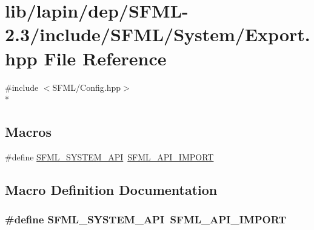 \hypertarget{lapin_2dep_2_s_f_m_l-2_83_2include_2_s_f_m_l_2_system_2_export_8hpp}{\section{lib/lapin/dep/\-S\-F\-M\-L-\/2.3/include/\-S\-F\-M\-L/\-System/\-Export.hpp File Reference}
\label{lapin_2dep_2_s_f_m_l-2_83_2include_2_s_f_m_l_2_system_2_export_8hpp}
}
{\ttfamily \#include $<$S\-F\-M\-L/\-Config.\-hpp$>$}\\*
\subsection*{Macros}
\begin{DoxyCompactItemize}
\item 
\#define \hyperlink{lapin_2dep_2_s_f_m_l-2_83_2include_2_s_f_m_l_2_system_2_export_8hpp_a6476c9e422606477a4c23d92b1d79a1f}{S\-F\-M\-L\-\_\-\-S\-Y\-S\-T\-E\-M\-\_\-\-A\-P\-I}~\hyperlink{sfml_2dep_2_s_f_m_l-2_84_82_2include_2_s_f_m_l_2_config_8hpp_aba0bbe5791bee6633caa835c7f6a12a4}{S\-F\-M\-L\-\_\-\-A\-P\-I\-\_\-\-I\-M\-P\-O\-R\-T}
\end{DoxyCompactItemize}


\subsection{Macro Definition Documentation}
\hypertarget{lapin_2dep_2_s_f_m_l-2_83_2include_2_s_f_m_l_2_system_2_export_8hpp_a6476c9e422606477a4c23d92b1d79a1f}{
\subsubsection[{S\-F\-M\-L\-\_\-\-S\-Y\-S\-T\-E\-M\-\_\-\-A\-P\-I}]{\setlength{\rightskip}{0pt plus 5cm}\#define S\-F\-M\-L\-\_\-\-S\-Y\-S\-T\-E\-M\-\_\-\-A\-P\-I~{\bf S\-F\-M\-L\-\_\-\-A\-P\-I\-\_\-\-I\-M\-P\-O\-R\-T}}}\label{lapin_2dep_2_s_f_m_l-2_83_2include_2_s_f_m_l_2_system_2_export_8hpp_a6476c9e422606477a4c23d92b1d79a1f}
